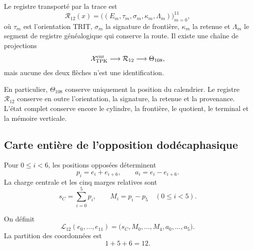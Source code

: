\begin{definition}
\label{p3-83-c25-s4:def:registro-enriquecido-dodecafasico}
Le registre transporté par la trace est
\[
 \mathcal R_{12}(x)=
 \bigl((E_m,\tau_m,\sigma_m,\kappa_m,\Lambda_m)\bigr)_{m=0}^{11},
\]
où \(\tau_m\) est l’orientation TRIT, \(\sigma_m\) la signature de
frontière, \(\kappa_m\) la retenue et \(\Lambda_m\) le segment de registre généalogique
qui conserve la route. Il existe une chaîne de projections
\[
 \mathcal X_{\rm TPK}^{\rm enr}
 \longrightarrow\mathcal R_{12}
 \longrightarrow\Theta_{108},
\]
mais aucune des deux flèches n’est une identification.
\end{definition}

En particulier, \(\Theta_{108}\) conserve uniquement la position du calendrier.
Le registre \(\mathcal R_{12}\) conserve en outre l’orientation, la signature,
la retenue et la provenance. L’état complet conserve encore le cylindre,
la frontière, le quotient, le terminal et la mémoire verticale.

\subsection{Carte entière de l’opposition dodécaphasique}

Pour \(0\leq i<6\), les positions opposées déterminent
\begin{equation}
 p_i=e_i+e_{i+6},
 \qquad
 a_i=e_i-e_{i+6}.
 \label{p3-83-c25-s4:eq:pares-opuestos-registro}
\end{equation}
La charge centrale et les cinq marges relatives sont
\begin{equation}
 s_C=\sum_{i=0}^{5}p_i,
 \qquad
 M_i=p_i-p_5\quad(0\leq i<5).
 \label{p3-83-c25-s4:eq:carga-margenes-registro}
\end{equation}

\begin{definition}
\label{p3-83-c25-s4:def:carta-integral-156}
On définit
\begin{equation}
 \mathcal L_{12}(e_0,\ldots,e_{11})
 =\bigl(s_C,M_0,\ldots,M_4,a_0,\ldots,a_5\bigr).
 \label{p3-83-c25-s4:eq:carta-integral-156}
\end{equation}
La partition des coordonnées est
\[
 1+5+6=12.
\]
\end{definition}


